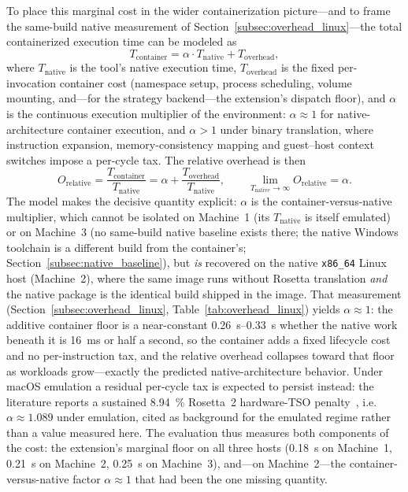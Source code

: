 To place this marginal cost in the wider containerization picture---and to frame the same-build native measurement of Section~\ref{subsec:overhead_linux}---the total containerized execution time can be modeled as
\begin{equation}
T_{\text{container}} = \alpha \cdot T_{\text{native}} + T_{\text{overhead}},
\end{equation}
where $T_{\text{native}}$ is the tool's native execution time, $T_{\text{overhead}}$ is the fixed per-invocation container cost (namespace setup, process scheduling, volume mounting, and---for the strategy backend---the extension's dispatch floor), and $\alpha$ is the continuous execution multiplier of the environment: $\alpha \approx 1$ for native-architecture container execution, and $\alpha > 1$ under binary translation, where instruction expansion, memory-consistency mapping and guest--host context switches impose a per-cycle tax. The relative overhead is then
\begin{equation}
O_{\text{relative}} = \frac{T_{\text{container}}}{T_{\text{native}}} = \alpha + \frac{T_{\text{overhead}}}{T_{\text{native}}},
\qquad
\lim_{T_{\text{native}} \to \infty} O_{\text{relative}} = \alpha .
\end{equation}
The model makes the decisive quantity explicit: $\alpha$ is the container-versus-native multiplier, which cannot be isolated on Machine~1 (its $T_{\text{native}}$ is itself emulated) or on Machine~3 (no same-build native baseline exists there; the native Windows toolchain is a different build from the container's; Section~\ref{subsec:native_baseline}), but \emph{is} recovered on the native \texttt{x86\_64} Linux host (Machine~2), where the same image runs without Rosetta translation \emph{and} the native package is the identical build shipped in the image. That measurement (Section~\ref{subsec:overhead_linux}, Table~\ref{tab:overhead_linux}) yields $\alpha \approx 1$: the additive container floor is a near-constant \SIrange{0.26}{0.33}{\second} whether the native work beneath it is \SI{16}{\milli\second} or half a second, so the container adds a fixed lifecycle cost and no per-instruction tax, and the relative overhead collapses toward that floor as workloads grow---exactly the predicted native-architecture behavior. Under macOS emulation a residual per-cycle tax is expected to persist instead: the literature reports a sustained \SI{8.94}{\percent} Rosetta~2 hardware-TSO penalty~\cite{Wrenger2024AppleM1}, i.e.\ $\alpha \approx 1.089$ under emulation, cited as background for the emulated regime rather than a value measured here. The evaluation thus measures both components of the cost: the extension's marginal floor on all three hosts (\SI{0.18}{\second} on Machine~1, \SI{0.21}{\second} on Machine~2, \SI{0.25}{\second} on Machine~3), and---on Machine~2---the container-versus-native factor $\alpha \approx 1$ that had been the one missing quantity.

